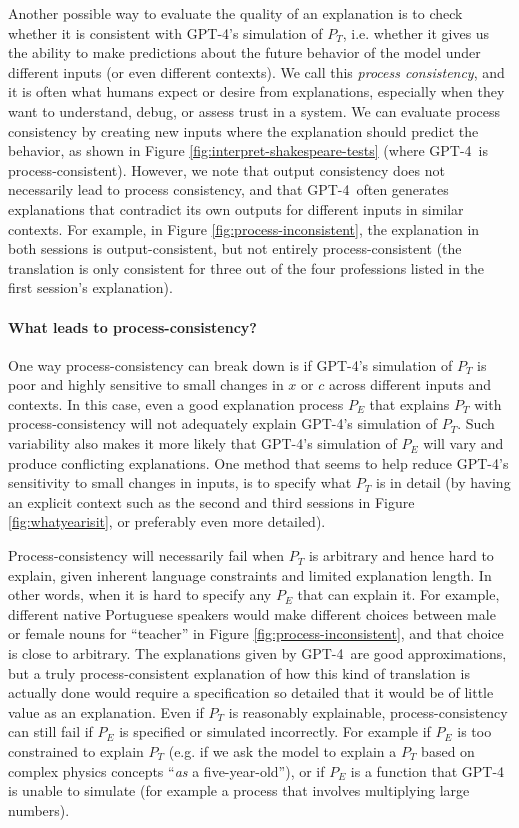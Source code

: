 Another possible way to evaluate the quality of an explanation is to check whether it is consistent with GPT-4's simulation of $P_T$, i.e. whether it gives us the ability to make predictions about the future behavior of the model under different inputs (or even different contexts). We call this \emph{process consistency}, and it is often what humans expect or desire from explanations, especially when they want to understand, debug, or assess trust in a system. We can evaluate process consistency by creating new inputs where the explanation should predict the behavior, as shown in Figure \ref{fig:interpret-shakespeare-tests} (where GPT-4\ is process-consistent). However, we note that output consistency does not necessarily lead to process consistency, and that GPT-4\ often generates explanations that contradict its own outputs for different inputs in similar contexts. For example, in Figure \ref{fig:process-inconsistent}, the explanation in both sessions is output-consistent, but not entirely process-consistent (the translation is only consistent for three out of the four professions listed in the first session's explanation).

\paragraph{What leads to process-consistency?}

One way process-consistency can break down is if GPT-4's simulation of $P_T$ is poor and highly sensitive to small changes in $x$ or $c$ across different inputs and contexts. In this case, even a good explanation process $P_E$ that explains $P_T$ with process-consistency will not adequately explain GPT-4's simulation of $P_T$. Such variability also makes it more likely that GPT-4's simulation of $P_E$ will vary and produce conflicting explanations. One method that seems to help reduce {GPT-4}'s sensitivity to small changes in inputs, is to specify what $P_T$ is in detail (by having an explicit context such as the second and third sessions in Figure \ref{fig:whatyearisit}, or preferably even more detailed).

Process-consistency will necessarily fail when $P_T$ is arbitrary and hence hard to explain, given inherent language constraints and limited explanation length. In other words, when it is hard to specify any $P_E$ that can explain it. For example, different native Portuguese speakers would make different choices between male or female nouns for ``teacher'' in Figure \ref{fig:process-inconsistent}, and that choice is close to arbitrary. The explanations given by GPT-4\ are good approximations, but a truly process-consistent explanation of how this kind of translation is actually done would require a specification so detailed that it would be of little value as an explanation. Even if $P_T$ is reasonably explainable, process-consistency can still fail if  $P_E$  is specified or simulated incorrectly. For example if $P_E$ is too constrained to explain $P_T$ (e.g. if we ask the model to explain a $P_T$ based on complex physics concepts ``{\it as} a five-year-old''), or if $P_E$ is a function that {GPT-4} is unable to simulate (for example a process that involves multiplying large numbers).

